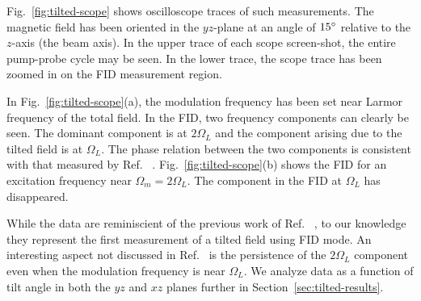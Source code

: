 Fig.~\ref{fig:tilted-scope} shows oscilloscope traces of such
measurements.  The magnetic field has been oriented in the $yz$-plane
at an angle of $15\degree$ relative to the $z$-axis (the beam axis).
In the upper trace of each scope screen-shot, the entire pump-probe
cycle may be seen.  In the lower trace, the scope trace has been
zoomed in on the FID measurement region.

In Fig.~\ref{fig:tilted-scope}(a), the modulation frequency has been
set near Larmor frequency of the total field.  In the FID, two
frequency components can clearly be seen.  The dominant component is
at $2\Omega_L$ and the component arising due to the tilted field is at
$\Omega_L$.  The phase relation between the two components is
consistent with that measured by Ref.~\cite{PhysRevA.74.063420} .
Fig.~\ref{fig:tilted-scope}(b) shows the FID for an excitation
frequency near $\Omega_m=2\Omega_L$.  The component in the FID at
$\Omega_L$ has disappeared.

While the data are reminiscient of the previous work of
Ref.~\cite{PhysRevA.74.063420} , to our knowledge they represent the first
measurement of a tilted field using FID mode.  An interesting aspect
not discussed in Ref.~\cite{PhysRevA.74.063420}  is the persistence of the
$2\Omega_L$ component even when the modulation frequency is near
$\Omega_L$.  We analyze data as a function of tilt angle in both the
$yz$ and $xz$ planes further in Section~\ref{sec:tilted-results}.
